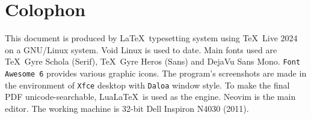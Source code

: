 \clearpage
{}
{}
\chapter*{Colophon}

This document is produced by \LaTeX\ typesetting system using \TeX\ Live 2024 on a GNU/Linux system. Void Linux is used to date. Main fonts used are \TeX\ Gyre Schola (Serif), \TeX\ Gyre Heros (Sans) and DejaVu Sans Mono. \texttt{Font\,Awesome\,6} provides various graphic icons. The program's screenshots are made in the environment of \texttt{Xfce} desktop with \texttt{Daloa} window style. To make the final PDF unicode-searchable, Lua\LaTeX\ is used as the engine. Neovim is the main editor. The working machine is 32-bit Dell Inspiron N4030 (2011).
